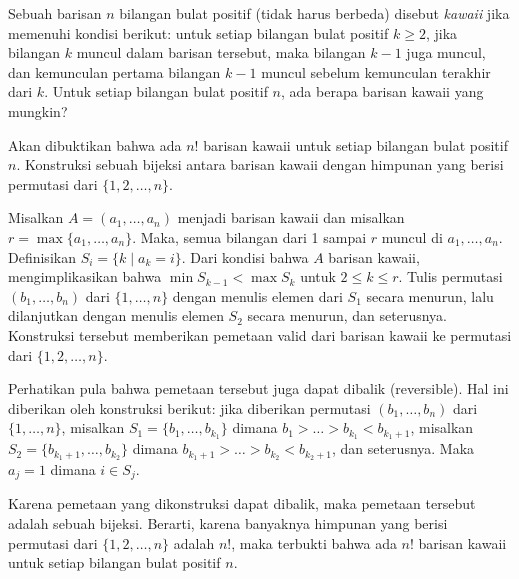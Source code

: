 \documentclass[11pt]{scrartcl}
\begin{document}
\begin{soaljawab}
    Sebuah barisan $n$ bilangan bulat positif (tidak harus berbeda) disebut \textit{kawaii} jika memenuhi kondisi berikut: untuk setiap bilangan bulat positif $k \ge 2$, jika bilangan $k$ muncul dalam barisan tersebut, maka bilangan $k-1$ juga muncul, dan kemunculan pertama bilangan $k-1$ muncul sebelum kemunculan terakhir dari $k$. Untuk setiap bilangan bulat positif $n$, ada berapa barisan kawaii yang mungkin?
    \begin{solusi}
        Akan dibuktikan bahwa ada $n!$ barisan kawaii untuk setiap bilangan bulat positif $n$. Konstruksi sebuah bijeksi antara barisan kawaii dengan himpunan yang berisi permutasi dari $\{1,2,\dots,n\}$.

        Misalkan $A=(a_1, \dots, a_n)$ menjadi barisan kawaii dan misalkan $r = \max\{a_1, \dots, a_n\}$. Maka, semua bilangan dari 1 sampai $r$ muncul di $a_1, \dots, a_n$. Definisikan $S_i = \{k \mid a_k = i\}$. Dari kondisi bahwa $A$ barisan kawaii, mengimplikasikan bahwa $\min S_{k-1} < \max S_k$ untuk $2 \le k \le r$. Tulis permutasi $(b_1, \dots, b_n)$ dari $\{1,\dots,n\}$ dengan menulis elemen dari $S_1$ secara menurun, lalu dilanjutkan dengan menulis elemen $S_2$ secara menurun, dan seterusnya. Konstruksi tersebut memberikan pemetaan valid dari barisan kawaii ke permutasi dari $\{1,2,\dots,n\}$.

        Perhatikan pula bahwa pemetaan tersebut juga dapat dibalik (reversible). Hal ini diberikan oleh konstruksi berikut: jika diberikan permutasi $(b_1, \dots, b_n)$ dari $\{1,\dots,n\}$, misalkan $S_1 =  \{b_1,\dots,b_{k_1}\}$ dimana $b_1 > \dots >  b_{k_1} < b_{k_1+1}$, misalkan $S_2 =  \{b_{k_1+1},\dots,b_{k_2}\}$ dimana $b_{k_1+1} > \dots >  b_{k_2} < b_{k_2+1}$, dan seterusnya. Maka $a_j = 1$ dimana $i \in S_j$.

        Karena pemetaan yang dikonstruksi dapat dibalik, maka pemetaan tersebut adalah sebuah bijeksi. Berarti, karena banyaknya himpunan yang berisi permutasi dari $\{1,2,\dots,n\}$ adalah $n!$, maka terbukti bahwa ada $n!$ barisan kawaii untuk setiap bilangan bulat positif $n$.
    \end{solusi}
\end{soaljawab}
\end{document}
